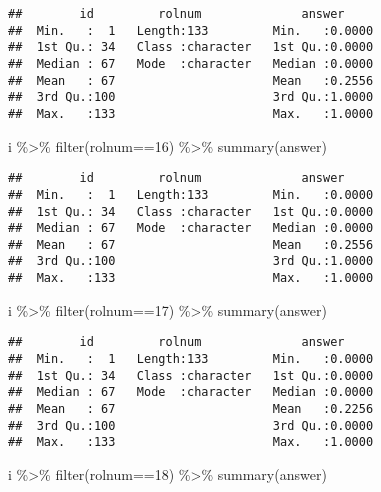 \documentclass[
]{article}
\newenvironment{Shaded}{\begin{snugshade}}{\end{snugshade}}
\newcommand{\DecValTok}[1]{\textcolor[rgb]{0.00,0.00,0.81}{#1}}
\newcommand{\FunctionTok}[1]{\textcolor[rgb]{0.00,0.00,0.00}{#1}}
\newcommand{\NormalTok}[1]{#1}
\newcommand{\SpecialCharTok}[1]{\textcolor[rgb]{0.00,0.00,0.00}{#1}}
\begin{document}
\begin{enumerate}
\begin{verbatim}
##        id         rolnum              answer      
##  Min.   :  1   Length:133         Min.   :0.0000  
##  1st Qu.: 34   Class :character   1st Qu.:0.0000  
##  Median : 67   Mode  :character   Median :0.0000  
##  Mean   : 67                      Mean   :0.2556  
##  3rd Qu.:100                      3rd Qu.:1.0000  
##  Max.   :133                      Max.   :1.0000
\end{verbatim}

\begin{Shaded}
\begin{Highlighting}[]
\NormalTok{i }\SpecialCharTok{\%\textgreater{}\%} \FunctionTok{filter}\NormalTok{(rolnum}\SpecialCharTok{==}\DecValTok{16}\NormalTok{) }\SpecialCharTok{\%\textgreater{}\%} \FunctionTok{summary}\NormalTok{(answer)}
\end{Highlighting}
\end{Shaded}

\begin{verbatim}
##        id         rolnum              answer      
##  Min.   :  1   Length:133         Min.   :0.0000  
##  1st Qu.: 34   Class :character   1st Qu.:0.0000  
##  Median : 67   Mode  :character   Median :0.0000  
##  Mean   : 67                      Mean   :0.2556  
##  3rd Qu.:100                      3rd Qu.:1.0000  
##  Max.   :133                      Max.   :1.0000
\end{verbatim}

\begin{Shaded}
\begin{Highlighting}[]
\NormalTok{i }\SpecialCharTok{\%\textgreater{}\%} \FunctionTok{filter}\NormalTok{(rolnum}\SpecialCharTok{==}\DecValTok{17}\NormalTok{) }\SpecialCharTok{\%\textgreater{}\%} \FunctionTok{summary}\NormalTok{(answer)}
\end{Highlighting}
\end{Shaded}

\begin{verbatim}
##        id         rolnum              answer      
##  Min.   :  1   Length:133         Min.   :0.0000  
##  1st Qu.: 34   Class :character   1st Qu.:0.0000  
##  Median : 67   Mode  :character   Median :0.0000  
##  Mean   : 67                      Mean   :0.2256  
##  3rd Qu.:100                      3rd Qu.:0.0000  
##  Max.   :133                      Max.   :1.0000
\end{verbatim}

\begin{Shaded}
\begin{Highlighting}[]
\NormalTok{i }\SpecialCharTok{\%\textgreater{}\%} \FunctionTok{filter}\NormalTok{(rolnum}\SpecialCharTok{==}\DecValTok{18}\NormalTok{) }\SpecialCharTok{\%\textgreater{}\%} \FunctionTok{summary}\NormalTok{(answer)}
\end{Highlighting}
\end{Shaded}


\end{enumerate}
\end{document}
